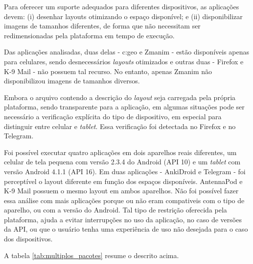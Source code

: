 Para oferecer um suporte adequados para diferentes dispositivos, as aplicações
devem: (i) desenhar layouts otimizando o espaço disponível; e (ii) disponibilizar
imagens de tamanhos diferentes, de forma que não necessitam ser redimensionadas
pela plataforma em tempo de execução.

Das aplicações analisadas, duas delas - c:geo e Zmanim - estão disponíveis apenas
para celulares, sendo desnecessários \textit{layouts} otimizados e outras duas - Firefox
e K-9 Mail - não possuem tal recurso. No entanto, apenas Zmanim não disponibilizou
imagens de tamanhos diversos.

Embora o arquivo contendo a descrição do \textit{layout} seja carregada pela própria
plataforma, sendo transparente para a aplicação, em algumas situações pode ser
necessário a verificação explícita do tipo de dispositivo, em especial para
distinguir entre celular e \textit{tablet}. Essa verificação foi detectada no Firefox
e no Telegram.

Foi possível executar quatro aplicações em dois aparelhos reais diferentes,
um celular de tela pequena com versão 2.3.4 do Android (API 10) e um \textit{tablet} com
versão Android 4.1.1 (API 16). Em duas aplicações - AnkiDroid e Telegram  - foi perceptível
o layout diferente em função dos espaços disponíveis. AntennaPod e K-9 Mail possuem
o mesmo layout em ambos aparelhos. Não foi possível fazer essa análise com mais
aplicações porque ou não eram compativeis com o tipo de aparelho, ou com a versão
do Android. Tal tipo de restrição oferecida pela plataforma, ajuda a evitar
interrupções no uso da aplicação, no caso de versões da API, ou que o usuário
tenha uma experiência de uso não desejada para o caso dos dispositivos.

A tabela \ref{tab:multiplos_pacotes} resume o descrito acima.

